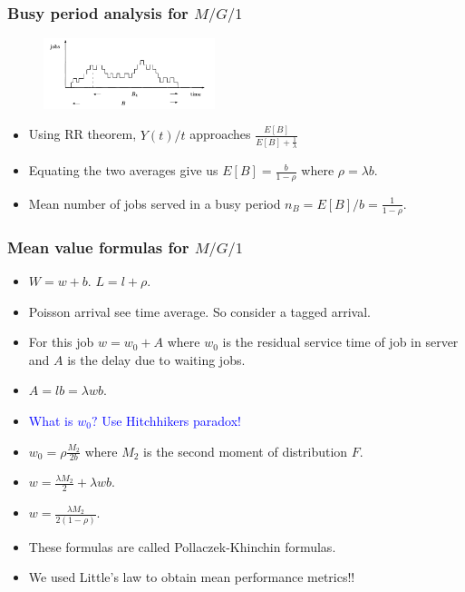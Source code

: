 \documentclass{beamer}
\def \mp {\pause}
\def \mp {}
\newcommand{\ft}[1]{\frametitle{#1}}
\newcommand{\tcb}[1]{\textcolor{blue}{#1}}
\begin{document}
 \begin{frame}
 \ft{Busy period analysis for $M/G/1$}
   \begin{figure}
\includegraphics[width=5cm]{busy}
\centering
\end{figure}
\begin{itemize}\setlength\itemsep{.7em}

\mp\item Using RR theorem, $Y(t)/t$ approaches $\frac{E[B]}{E[B] + \frac{1}{\lambda}}$
\mp\item Equating the two averages give us $E[B] = \frac{b}{1-\rho}$ where $\rho = \lambda b$.
\mp\item Mean number of jobs served in a busy period $n_B = E[B]/b = \frac{1}{1- \rho}$.
 \end{itemize}
\end{frame}   
 
  \begin{frame}
 \ft{Mean value formulas for $M/G/1$}
 \begin{itemize}\setlength\itemsep{.6em}
\mp\item $W = w + b.$ $L = l + \rho.$
\mp\item Poisson arrival see time average. So consider a tagged arrival.
\mp\item For this job $w = w_0 + A$ where $w_0$ is the residual service time of job in server and $A$ is the delay due to waiting jobs.
\mp\item $A = lb = \lambda wb$.
\mp \item \tcb{What is $w_0?$ \mp Use Hitchhikers paradox!}
\mp\item $w_0 = \rho \frac{M_2}{2b}$ where $M_2$ is the second moment of distribution $F$.
\mp \item $w = \frac{\lambda M_2}{2} + \lambda wb.$
\mp\item $w = \frac{\lambda M_2}{2(1-\rho)}$.
\mp \item These formulas are called Pollaczek-Khinchin formulas.
\mp\item We used Little's law to obtain mean performance metrics!!
 \end{itemize}
\end{frame}   
 
\end{document}
